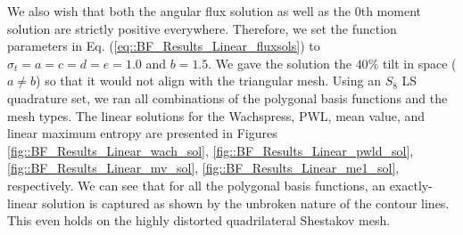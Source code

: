\noindent We also wish that both the angular flux solution as well as the 0th moment solution are strictly positive everywhere. Therefore, we set the function parameters in Eq. (\ref{eq::BF_Results_Linear_fluxsols}) to $\sigma_t = a = c = d = e = 1.0$ and $b = 1.5$. We gave the solution the $40 \%$ tilt in space ($a \neq b$) so that it would not align with the triangular mesh. Using an $S_8$ LS quadrature set, we ran all combinations of the polygonal basis functions and the mesh types. The linear solutions for the Wachspress, PWL, mean value, and linear maximum entropy are presented in Figures \ref{fig::BF_Results_Linear_wach_sol}, \ref{fig::BF_Results_Linear_pwld_sol}, \ref{fig::BF_Results_Linear_mv_sol}, \ref{fig::BF_Results_Linear_me1_sol}, respectively. We can see that for all the polygonal basis functions, an exactly-linear solution is captured as shown by the unbroken nature of the contour lines. This even holds on the highly distorted quadrilateral Shestakov mesh.

